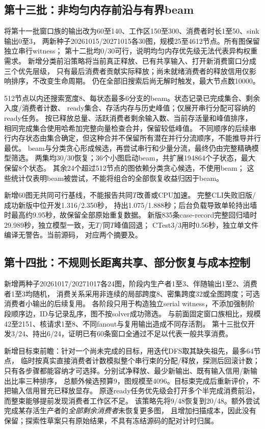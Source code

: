 \documentclass[UTF8,a4paper,11pt,fontset=fandol]{ctexart}
\begin{document}
\subsection{第十三批：非均匀内存前沿与有界beam}
将第十一批窗口族的输出改为60至140、工作区150至300、消费者时长1至50、sink输出0至3，
两新种子20261015/20271015各30图，规模25至4612节点。所有图保留独立串行witness；
第十二批均0/30可行，说明均匀内存优先级无法代表异构权重需求。
新增分类前沿策略将当前真正释放、已有共享输入、打开新消费窗口分成三个优先层级，
只有最后消费者贡献实际释放；尚未就绪消费者的释放信用仅影响排序，不改变生命周期。
仍在全部旧搜索后尚无解时触发，最大节点数10000。

512节点以内还搜索宽度8、每状态最多6分支的beam。状态记录已完成集合、剩余入度/消费者计数、
ready集合、存活内存与历史峰值；仅展开串行分配可容纳的ready任务。
按已释放总量、活跃消费者剩余输入数、当前存活量和峰值排序，
相同完成集合使用哈希加完整向量检查合并，保留较低峰值。
不同顺序的后续串行内存状态由集合确定，但这种合并不保留所有潜在并行分流顺序，不能推导并行最优。
beam与分类贪心形成候选，再尝试串行和少量分流，最终仍由完整精确模型筛选。
两集均30/30恢复；36个小图启动beam，共扩展194864个子状态，最大保留8个状态。
其余24个超过512节点的图依赖分类贪心候选，不使用beam；
这些统计仅表明beam被尝试，不能将组合的全部恢复收益归因于beam。

新增60图无共同可行基线，不能报告共同$T$改善或CPU加速。
完整CLI失败旧版/成功新版中位开发1.316/\allowbreak{}2.350秒，
持出1.075/\allowbreak{}1.888秒；后台负载导致单轮持出墙时最高约9.95秒，故保留全部原始重复数据。
新版835条case-record完整回归墙时29.989秒，独立模型一致，无$T$/同$T$峰值回退；
CTest3/3用时0.56秒，独立单文件编译无警告。当前源码，
对应两个摘要及。

\subsection{第十四批：不规则长距离共享、部分恢复与成本控制}
新增两种子20261017/20271017各24图，阶段内生产者1至3、伴随输出1至2、消费者1至3均随机，
消费关系采用非连续的局部跨度8、密集跨度32或全图跨度；可选消费者小输出的后续复用。
各阶段只用于构造独立serial witness，不添加强制阶段顺序边，ID与记录乱序，图不按solver成功筛选。
与前面固定窗口族相比，规模42至2151、核请求1至8、不同fanout与复用输出造成不同存活割。
第十三批仅开发3/24、持出6/24，证明已有60条窗口全通过不足以代表一般共享消费。

新增目标束前瞻：针对一个尚未完成的目标，用迭代DFS取其缺失祖先，最多64节点，
临时按真实直接消费者计数模拟整个串行束的分配/释放，探测后回滚计数；
只有各步骤都能容纳才可选择。分别试净释放、最少新输出、既有输入信用/新输出比率三种排序，
总额外候选预算9，图规模至4096。目标束完成后重新评价，不把输入信用冒充已释放显存。
原逐ready任务优先级会打开多个半完成消费前沿，而整束能够提前发现消费者工作区不足。
该策略先将9/48恢复到20/48。额外尝试完成某存活生产者的\emph{全部剩余消费者}未恢复更多图，
且增加扫描成本，因此没有保留；探索性草案只有原始结果，不具有冻结源码的配对计时归属。
\end{document}
